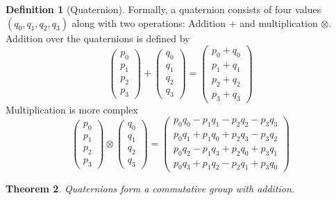 \documentclass{amsart}
\newtheorem{theorem}{Theorem}[section]
\theoremstyle{definition}
\newtheorem{definition}[theorem]{Definition}
\theoremstyle{remark}
\numberwithin{equation}{section}
\begin{document}
\begin{definition}[Quaternion]
  Formally, a quaternion consists of four values $(q_0, q_1, q_2, q_3)$ along with two operations: Addition $+$ and multiplication $\otimes$.
  Addition over the quaternions is defined by
  \begin{equation}
    \begin{pmatrix}
      p_0 \\
      p_1 \\
      p_2 \\
      p_3
    \end{pmatrix} +
    \begin{pmatrix}
      q_0 \\
      q_1 \\
      q_2 \\
      q_3
    \end{pmatrix} =
    \begin{pmatrix}
      p_0 + q_0 \\
      p_1 + q_1 \\
      p_2 + q_2 \\
      p_3 + q_3
    \end{pmatrix}
  \end{equation}
  Multiplication is more complex
  \begin{equation}
    \begin{pmatrix}
      p_0 \\
      p_1 \\
      p_2 \\
      p_3
    \end{pmatrix} \otimes 
    \begin{pmatrix}
      q_0 \\
      q_1 \\
      q_2 \\
      q_3
    \end{pmatrix} =
    \begin{pmatrix}
      p_0q_0 - p_1q_1 - p_2q_2 - p_3q_3 \\
      p_0q_1 + p_1q_0 + p_2q_3 - p_3q_2 \\
      p_0q_2 - p_1q_3 + p_2q_0 + p_3q_1 \\
      p_0q_3 + p_1q_2 - p_2q_1 + p_3q_0
    \end{pmatrix}
  \end{equation}
\end{definition}
\begin{theorem}
  Quaternions form a commutative group with addition.
\end{theorem}
\end{document}

